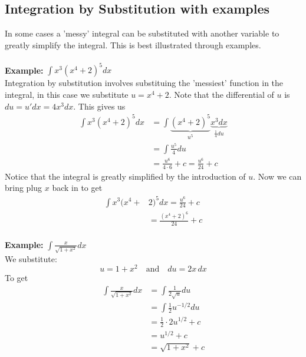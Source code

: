 \documentclass{report}
\begin{document}
\subsection{Integration by Substitution with examples} %
In some cases a 'messy' integral can be substituted with another variable
to greatly simplify the integral. This is best illustrated through examples.\\
\vspace{1mm}\\
\textbf{Example:} $\int x^3(x^4+2)^5dx$\\
Integration by substitution involves substituing the 'messiest' function in the integral,
in this case we substitute $u=x^4+2$. Note that the differential of $u$ 
is $du=u'dx=4x^3dx$. This gives us
\begin{align*}
\int x^3(x^4+2)^5dx&=\int\underbrace{(x^4+2)^5}_{u^5}
\underbrace{x^3dx}_{\frac{1}{4}du}\\
&=\int\frac{u^5}{4}du\\
&=\frac{u^6}{4\cdot6}+c=\frac{u^6}{24}+c
\end{align*}
Notice that the integral is greatly simplified by the introduction of $u$. Now we 
can bring plug $x$ back in to get
\begin{align*}
\int x^3(x^4+&2)^5dx=\frac{u^6}{24}+c\\
&=\frac{(x^4+2)^6}{24}+c
\end{align*}
\vspace{1mm}\\
\textbf{Example:} $\int\frac{x}{\sqrt{1+x^2}}dx$\\
We substitute:
\begin{equation*}
u=1+x^2\quad\text{and}\quad du=2x\,dx
\end{equation*}
To get
\begin{align*}
\int\frac{x}{\sqrt{1+x^2}}dx&=
\int\frac{1}{2\sqrt{u}}du\\
&=\int\frac{1}{2}u^{-1/2}du\\
&=\frac{1}{2}\cdot2u^{1/2}+c\\
&=u^{1/2}+c\\
&=\sqrt{1+x^2}+c
\end{align*}
\newpage
\end{document}
